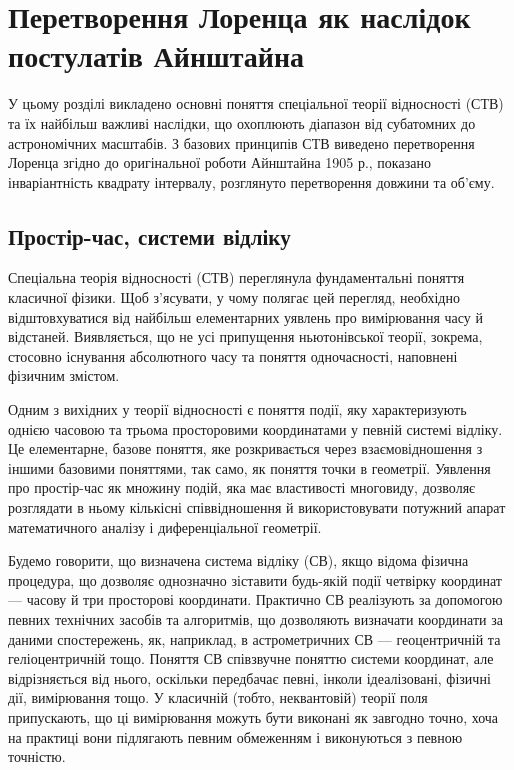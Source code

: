 
\chapter{Перетворення Лоренца як наслідок постулатів Айнштайна}\label{\currfilebase}

У цьому розділі викладено основні поняття спеціальної теорії відносності (СТВ) та їх найбільш важливі наслідки, що охоплюють діапазон від субатомних до астрономічних  масштабів. З базових принципів СТВ виведено перетворення Лоренца згідно до оригінальної роботи Айнштайна 1905 р., показано інваріантність квадрату інтервалу, розглянуто перетворення довжини та об'єму.

\section{Простір-час, системи відліку}

Спеціальна теорія відносності (СТВ) переглянула фундаментальні поняття класичної фізики. Щоб з'ясувати, у чому полягає цей перегляд, необхідно відштовхуватися від найбільш елементарних уявлень про вимірювання часу й відстаней. Виявляється, що не усі припущення ньютонівської теорії, зокрема, стосовно існування абсолютного часу та поняття одночасності, наповнені фізичним змістом.

Одним з вихідних у теорії відносності є поняття події, яку характеризують однією часовою та трьома просторовими координатами у певній системі відліку. Це елементарне, базове поняття, яке розкривається через взаємовідношення з іншими базовими поняттями, так само, як поняття точки в геометрії. Уявлення про простір-час як множину подій, яка має властивості многовиду, дозволяє розглядати в ньому кількісні співвідношення й використовувати потужний апарат математичного аналізу і диференціальної геометрії.

Будемо говорити, що визначена система відліку (СВ), якщо відома фізична процедура, що дозволяє однозначно зіставити будь-якій події четвірку координат --- часову й три просторові координати. Практично СВ реалізують за допомогою певних технічних засобів та алгоритмів, що дозволяють визначати координати за даними спостережень, як, наприклад, в астрометричних СВ --- геоцентричній та геліоцентричній тощо. Поняття СВ співзвучне поняттю системи координат, але відрізняється від нього, оскільки передбачає певні, інколи ідеалізовані, фізичні дії, вимірювання тощо. У класичній (тобто, неквантовій) теорії поля припускають, що ці вимірювання можуть бути виконані як завгодно точно, хоча на практиці вони підлягають певним обмеженням і виконуються з певною точністю.

